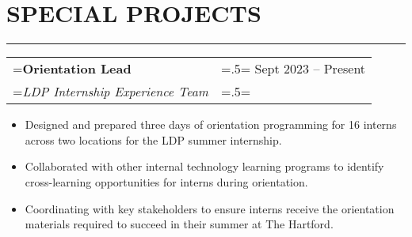 \documentclass{article}
\begin{document}



\section*{\normalsize{SPECIAL PROJECTS}}
\vspace{-1.8em}
\noindent\rule{\textwidth}{.5pt}

\vspace{.5em}
\hspace{-1em}
\begin{tabularx}{\textwidth}{
    >{\raggedright\arraybackslash\hsize=1.5\hsize\linewidth=\hsize}X
    >{\raggedleft\arraybackslash\hsize=.5\hsize\linewidth=\hsize}X }
    \textbf{Orientation Lead} & Sept 2023 -- Present\\
    \textit{LDP Internship Experience Team} & \\
\end{tabularx}
\vspace{-.5em}
\begin{itemize}[label={--}, leftmargin=1em]
    \setlength\itemsep{0em}
    \item Designed and prepared three days of orientation programming for 16 interns across two locations for the LDP summer internship.
    \item Collaborated with other internal technology learning programs to identify cross-learning opportunities for interns during orientation.
    \item Coordinating with key stakeholders to ensure interns receive the orientation materials required to succeed in their summer at The Hartford.
\end{itemize}
\end{document}
